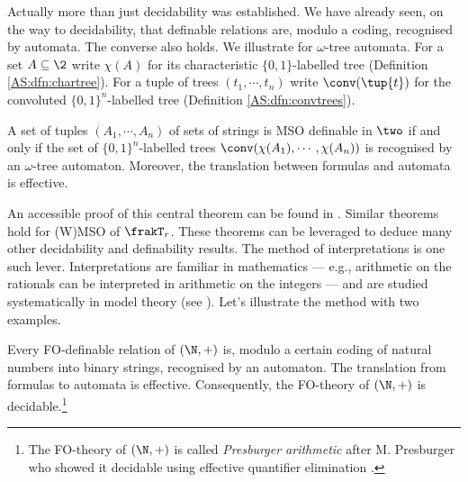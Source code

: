 Actually more than just decidability was established. We have already seen, on the way to decidability, that definable relations are, modulo a coding, recognised by automata. The converse also holds. We illustrate for $\omega$-tree automata. For a set $A \subseteq \2$ write $\chi(A)$ for its characteristic $\{0,1\}$-labelled tree (Definition \ref{AS:dfn:chartree}). For a tuple of trees $(t_1,\cdots,t_n)$ write $\conv(\tup{t})$
for the convoluted $\{0,1\}^n$-labelled tree (Definition \ref{AS:dfn:convtrees}).  

\begin{theorem} \label{AS:thm:RABIN}
A set of tuples $(A_1,\cdots,A_n)$ of sets of strings is MSO definable in $\two$ if and only if the set of $\{0,1\}^n$-labelled trees 
$\conv(\chi(A_1),\cdots,\chi(A_n))$ is recognised by an $\omega$-tree automaton. Moreover, the translation between formulas and automata is effective.
\end{theorem}

An accessible proof of this central theorem can be found in \cite{Thom90}. Similar theorems hold for (W)MSO of $\frakT_r$.
These theorems can be leveraged to deduce many other decidability and definability results. The method of interpretations is one such lever.
Interpretations are familiar in mathematics --- e.g., arithmetic on the rationals can be interpreted in arithmetic on the integers ---
and are studied systematically in model theory (see \cite{Hodg93}). Let's illustrate the method with two examples.





\begin{corollary} \label{AS:cor:pres}
 Every FO-definable relation of $(\N,+)$ is, modulo a certain coding of natural numbers into binary strings, recognised by an automaton. 
The translation from formulas to automata is effective. Consequently, the FO-theory of $(\N,+)$ is decidable.\footnote{The FO-theory of $(\N,+)$ is called {\em Presburger arithmetic} after M. Presburger who showed it decidable using effective quantifier elimination \cite{Pres29}.}

\end{corollary}

